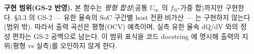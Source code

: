 \begin{warnbox}
\textbf{구현 범위(GS-2 반영).} 본 함수는 \emph{평형 합성}(공통 $U_\mathrm{oc}$ 의 $f_\mathrm{Si}$-가중
합)까지만 구현한다. §3.3 의 GS-2 --- 유한 율속의 SoC 구간별 host 전환$\cdot$비가산 --- 는 구현하지
않는다(범위 밖). 따라서 출력 곡선은 평형(OCV) 예측이며, 실측 유한 율속 dQ/dV 와의 정성 편차는 GS-2
공백으로 남는다. 이 범위 표식을 코드 docstring 에 명시해 출력의 지위(평형 vs 실측)를 오인하지 않게 한다.
\end{warnbox}

